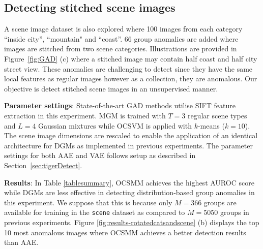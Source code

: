 \subsection{Detecting stitched scene images}
A scene image dataset is also explored where %
 100 images from each category ``inside city”, ``mountain" and ``coast”. 66 group anomalies are added where images are stitched from  two scene categories. %
Illustrations are provided in Figure~\ref{fig:GAD} (c) where a stitched image may contain half coast and half city street view. These anomalies are challenging to detect since they have the same local features as regular images however as a collection, they are anomalous.  Our objective is detect stitched scene images in an unsupervised manner.

\textbf{Parameter settings}:
State-of-the-art GAD methods utilise SIFT feature extraction in this experiment. MGM is trained with $T=3$ regular scene types and $L=4$ Gaussian mixtures while %
OCSVM is applied with $k$-means ($k=10$). The scene image dimensions are rescaled
to enable the application of an identical architecture for DGMs as implemented in previous experiments. %
The parameter settings for both AAE and VAE  follows setup as described in Section~\ref{sec:tigerDetect}.

{
\textbf{Results}:
In Table  \ref{tablesummary}, OCSMM achieves the highest AUROC score  %
while DGMs are less effective in detecting distribution-based group anomalies in this experiment. We suppose that this is because  only $M=366$ groups are available for training in the  {\tt scene} dataset as  compared to $M=5050$ groups in previous experiments.  Figure  \ref{fig:results-rotatedcatsandscene}   (b) displays the top 10 most anomalous images where OCSMM achieves a better detection results %
than AAE.
}

